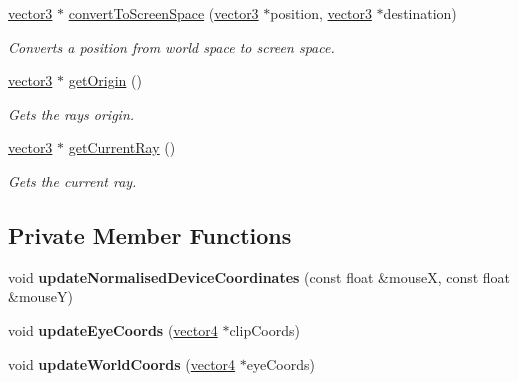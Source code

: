 \begin{DoxyCompactItemize}
\hyperlink{classflounder_1_1vector3}{vector3} $\ast$ \hyperlink{classflounder_1_1ray_acaa86f1a2a66ab56e7854a4ea11160a7}{convert\+To\+Screen\+Space} (\hyperlink{classflounder_1_1vector3}{vector3} $\ast$position, \hyperlink{classflounder_1_1vector3}{vector3} $\ast$destination)
\begin{DoxyCompactList}\small\item\em Converts a position from world space to screen space. \end{DoxyCompactList}\item 
\hyperlink{classflounder_1_1vector3}{vector3} $\ast$ \hyperlink{classflounder_1_1ray_af0a3765b066ae26607ca7a8b905b3d0b}{get\+Origin} ()
\begin{DoxyCompactList}\small\item\em Gets the rays origin. \end{DoxyCompactList}\item 
\hyperlink{classflounder_1_1vector3}{vector3} $\ast$ \hyperlink{classflounder_1_1ray_a675aec0722a9db426b32f598fdd3157a}{get\+Current\+Ray} ()
\begin{DoxyCompactList}\small\item\em Gets the current ray. \end{DoxyCompactList}\end{DoxyCompactItemize}
\subsection*{Private Member Functions}
\begin{DoxyCompactItemize}
\item 
\mbox{\label{classflounder_1_1ray_a1a85163a820b3cd2f691dc6587f187d5}} 
void {\bfseries update\+Normalised\+Device\+Coordinates} (const float \&mouseX, const float \&mouseY)
\item 
\mbox{\label{classflounder_1_1ray_a68cfbe54fdc766005edf19690cf5599c}} 
void {\bfseries update\+Eye\+Coords} (\hyperlink{classflounder_1_1vector4}{vector4} $\ast$clip\+Coords)
\item 
\mbox{\label{classflounder_1_1ray_a1005f85f5e2cb3c2eaced3049838f3da}} 
void {\bfseries update\+World\+Coords} (\hyperlink{classflounder_1_1vector4}{vector4} $\ast$eye\+Coords)
\end{DoxyCompactItemize}
